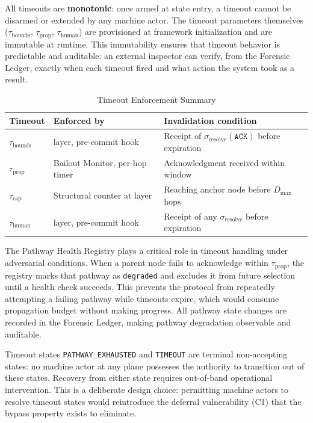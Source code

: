 All timeouts are \textbf{monotonic}: once armed at state entry, a timeout cannot be disarmed or extended by any machine actor. The timeout parameters themselves ($\tau_{\text{bounds}}$, $\tau_{\text{prop}}$, $\tau_{\text{human}}$) are provisioned at framework initialization and are immutable at runtime. This immutability ensures that timeout behavior is predictable and auditable: an external inspector can verify, from the Forensic Ledger, exactly when each timeout fired and what action the system took as a result.

\begin{table}[h]
\caption{Timeout Enforcement Summary}
\label{tab:bp-timeout-enforcement}
\small
\begin{tabular}{lp{3cm}p{5cm}}
\toprule
\textbf{Timeout} & \textbf{Enforced by} & \textbf{Invalidation condition} \\
\midrule
$\tau_{\text{bounds}}$  & \fact{} layer, pre-commit hook & Receipt of $\sigma_{\text{resolve}}(\texttt{ACK})$ before expiration \\
$\tau_{\text{prop}}$   & Bailout Monitor, per-hop timer & Acknowledgment received within window \\
$\tau_{\text{cap}}$    & Structural counter at \fact{} layer & Reaching anchor node before $D_{\max}$ hops \\
$\tau_{\text{human}}$  & \fact{} layer, pre-commit hook & Receipt of any $\sigma_{\text{resolve}}$ before expiration \\
\bottomrule
\end{tabular}
\end{table}

The Pathway Health Registry plays a critical role in timeout handling under adversarial conditions. When a parent node fails to acknowledge within $\tau_{\text{prop}}$, the registry marks that pathway as \texttt{degraded} and excludes it from future selection until a health check succeeds. This prevents the protocol from repeatedly attempting a failing pathway while timeouts expire, which would consume propagation budget without making progress. All pathway state changes are recorded in the Forensic Ledger, making pathway degradation observable and auditable.

Timeout states \texttt{PATHWAY\_EXHAUSTED} and \texttt{TIMEOUT} are terminal non-accepting states: no machine actor at any plane possesses the authority to transition out of these states. Recovery from either state requires out-of-band operational intervention. This is a deliberate design choice: permitting machine actors to resolve timeout states would reintroduce the deferral vulnerability (C1) that the bypass property exists to eliminate.